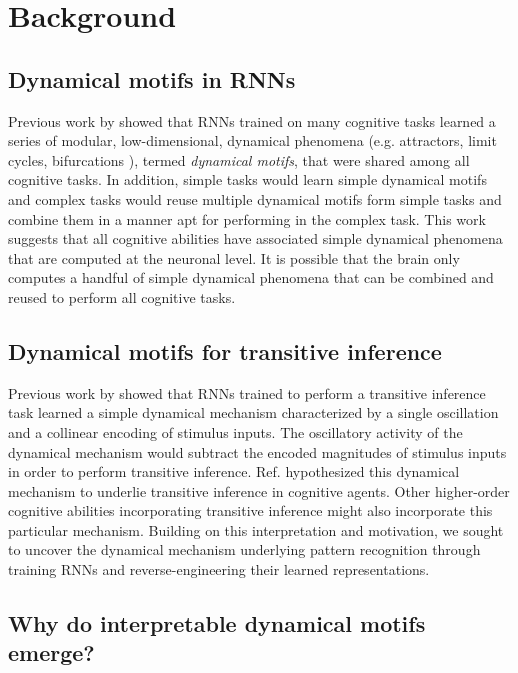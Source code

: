 \documentclass[conference]{IEEEtran}
\begin{document}
\section{Background}

\subsection{Dynamical motifs in RNNs}

Previous work by \cite{driscoll2022flexible} showed that RNNs trained on many cognitive tasks learned a series of modular, low-dimensional, dynamical phenomena (e.g. attractors, limit cycles, bifurcations \cite{strogatz2018nonlinear}), termed \textit{dynamical motifs}, that were shared among all cognitive tasks. In addition, simple tasks would learn simple dynamical motifs and complex tasks would reuse multiple dynamical motifs form simple tasks and combine them in a manner apt for performing in the complex task. This work suggests that all cognitive abilities have associated simple dynamical phenomena that are computed at the neuronal level. It is possible that the brain only computes a handful of simple dynamical phenomena that can be combined and reused to perform all cognitive tasks.

\subsection{Dynamical motifs for transitive inference}

Previous work by \cite{kay2022neural} showed that RNNs trained to perform a transitive inference task learned a simple dynamical mechanism characterized by a single oscillation and a collinear encoding of stimulus inputs. The oscillatory activity of the dynamical mechanism would subtract the encoded magnitudes of stimulus inputs in order to perform transitive inference. Ref. \cite{kay2022neural} hypothesized this dynamical mechanism to underlie transitive inference in cognitive agents. Other higher-order cognitive abilities incorporating transitive inference might also incorporate this particular mechanism. Building on this interpretation and motivation, we sought to uncover the dynamical mechanism underlying pattern recognition through training RNNs and reverse-engineering their learned representations.

\subsection{Why do interpretable dynamical motifs emerge?}
\label{interpretablemotifs}
\end{document}
